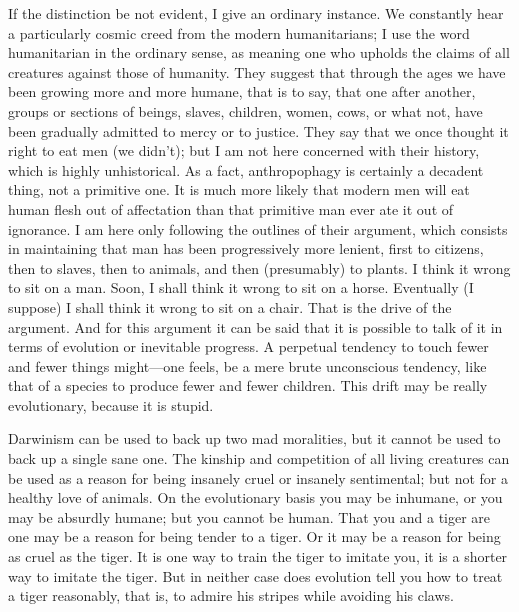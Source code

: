 If the distinction be not evident, I give an ordinary instance. We constantly hear a particularly cosmic creed from the modern humanitarians; I use the word humanitarian in the ordinary sense, as meaning one who upholds the claims of all creatures against those of humanity. They suggest that through the ages we have been growing more and more humane, that is to say, that one after another, groups or sections of beings, slaves, children, women, cows, or what not, have been gradually admitted to mercy or to justice. They say that we once thought it right to eat men (we didn’t); but I am not here concerned with their history, which is highly unhistorical. As a fact, anthropophagy is certainly a decadent thing, not a primitive one. It is much more likely that modern men will eat human flesh out of affectation than that primitive man ever ate it out of ignorance. I am here only following the outlines of their argument, which consists in maintaining that man has been progressively more lenient, first to citizens, then to slaves, then to animals, and then (presumably) to plants. I think it wrong to sit on a man. Soon, I shall think it wrong to sit on a horse. Eventually (I suppose) I shall think it wrong to sit on a chair. That is the drive of the argument. And for this argument it can be said that it is possible to talk of it in terms of evolution or inevitable progress. A perpetual tendency to touch fewer and fewer things might—one feels, be a mere brute unconscious tendency, like that of a species to produce fewer and fewer children. This drift may be really evolutionary, because it is stupid.

Darwinism can be used to back up two mad moralities, but it cannot be used to back up a single sane one. The kinship and competition of all living creatures can be used as a reason for being insanely cruel or insanely sentimental; but not for a healthy love of animals. On the evolutionary basis you may be inhumane, or you may be absurdly humane; but you cannot be human. That you and a tiger are one may be a reason for being tender to a tiger. Or it may be a reason for being as cruel as the tiger. It is one way to train the tiger to imitate you, it is a shorter way to imitate the tiger. But in neither case does evolution tell you how to treat a tiger reasonably, that is, to admire his stripes while avoiding his claws.

